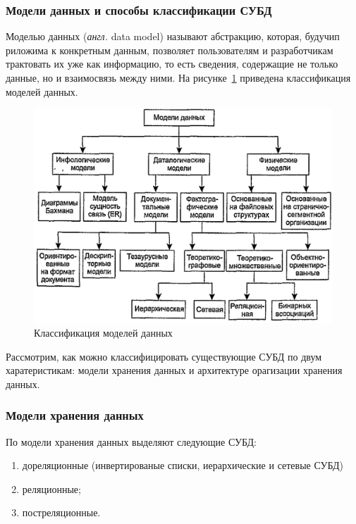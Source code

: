 \subsubsection{Модели данных и способы классификации СУБД}

Моделью данных  (\textit{англ.} data model) \cite{carpova-t-s} называют абстракцию, которая, будучип риложима к
конкретным данным, позволяет пользователям и разработчикам трактовать их уже как информацию, то есть сведения, содержащие не только данные, но и взаимосвязь между ними. На рисунке~\ref{fig:data-models} приведена классификация моделей данных.

\begin{figure}[h]
	\centering
	\captionsetup{justification=centering}
	\includegraphics[width=140mm]{datamodels.png}
	\caption{Классификация моделей данных}
	\label{fig:data-models}
\end{figure}

Рассмотрим, как можно классифицировать существующие СУБД по двум харатеристикам: модели хранения данных и архитектуре орагизации хранения данных.

\subsubsection{Модели хранения данных}

По модели хранения данных выделяют следующие СУБД:

\begin{enumerate}[label=\arabic*)]
	\item дореляционные (инвертированые списки, иерархические и сетевые СУБД)
	\item реляционные;
	\item постреляционные.
\end{enumerate}


